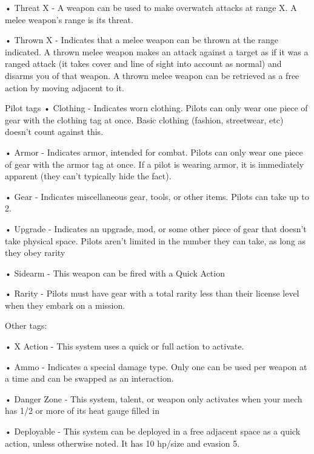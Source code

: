 •  \hypertarget{Threat}{Threat X} - A weapon can be used to make overwatch attacks at range X. A melee weapon’s
  range is its threat.

•  \hypertarget{Thrown}{Thrown X} - Indicates that a melee weapon can be thrown at the range indicated. A thrown
  melee weapon makes an attack against a target as if it was a ranged attack (it takes cover and
  line of sight into account as normal) and disarms you of that weapon. A thrown melee weapon
  can be retrieved as a free action by moving adjacent to it.


Pilot tags
•  \hypertarget{Clothing}{Clothing} - Indicates worn clothing. Pilots can only wear one piece of gear with the clothing tag
  at once. Basic clothing (fashion, streetwear, etc) doesn’t count against this.

•  \hypertarget{Armor}{Armor} - Indicates armor, intended for combat. Pilots can only wear one piece of gear with the
  armor tag at once. If a pilot is wearing armor, it is immediately apparent (they can’t typically
  hide the fact).

•  \hypertarget{Gear}{Gear} - Indicates miscellaneous gear, tools, or other items. Pilots can take up to 2.

•  \hypertarget{Upgrade}{Upgrade} - Indicates an upgrade, mod, or some other piece of gear that doesn’t take physical
  space. Pilots aren’t limited in the number they can take, as long as they obey rarity

•  \hypertarget{Sidearm}{Sidearm} - This weapon can be fired with a Quick Action

•  \hypertarget{Rarity}{Rarity} - Pilots must have gear with a total rarity less than their license level when they embark
  on a mission.

Other tags:

•  \hypertarget{Action}{X Action} - This system uses a quick or full action to activate.





•  \hypertarget{Ammo}{Ammo} - Indicates a special damage type. Only one can be used per weapon at a time and can
  be swapped as an interaction.

•  \hypertarget{Danger Zone}{Danger Zone} - This system, talent, or weapon only activates when your mech has 1/2 or more
  of its heat gauge filled in

•  Deployable - This system can be deployed in a free adjacent space as a quick action, unless
  otherwise noted. It has 10 hp/size and evasion 5.

